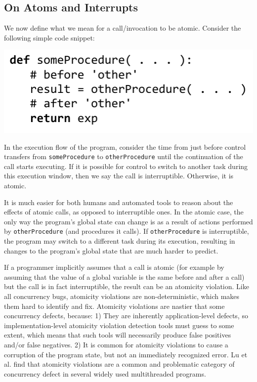 \documentclass[9pt,preprint]{sigplanconf}
\begin{document}
\subsection{On Atoms and Interrupts}

We now define what we mean for a call/invocation to be atomic.
Consider the following simple code snippet\footnotemark{}:

\noindent
\includegraphics[scale=0.7]{trivial_call}


In the execution flow of the program, consider the time from just before control transfers from \texttt{someProcedure} to \texttt{otherProcedure} until the continuation of the call starts executing.
If it is possible for control to switch to another task during this execution window, then we say the call is interruptible.
Otherwise, it is atomic.

It is much easier for both humans and automated tools to reason about the effects of atomic calls, as opposed to interruptible ones.
In the atomic case, the only way the program's global state can change is as a result of actions performed by \texttt{otherProcedure} (and procedures it calls).
If \texttt{otherProcedure} is interruptible, the program may switch to a different task during its execution, resulting in changes to the program's global state that are much harder to predict.

If a programmer implicitly assumes that a call is atomic (for example by assuming that the value of a global variable is the same before and after a call) but the call is in fact interruptible, the result can be an atomicity violation.
Like all concurrency bugs, atomicity violations are non-deterministic, which makes them hard to identify and fix.
Atomicity violations are nastier that some concurrency defects, because:
1) They are inherently application-level defects, so implementation-level atomicity violation detection tools must guess to some extent, which means that such tools will necessarily produce false positives and/or false negatives.
2) It is common for atomicity violations to cause a corruption of the program state, but not an immediately recognized error.
Lu et al. \cite{Lu2008} find that atomicity violations are a common and problematic category of concurrency defect in several widely used multithreaded programs.
\end{document}
